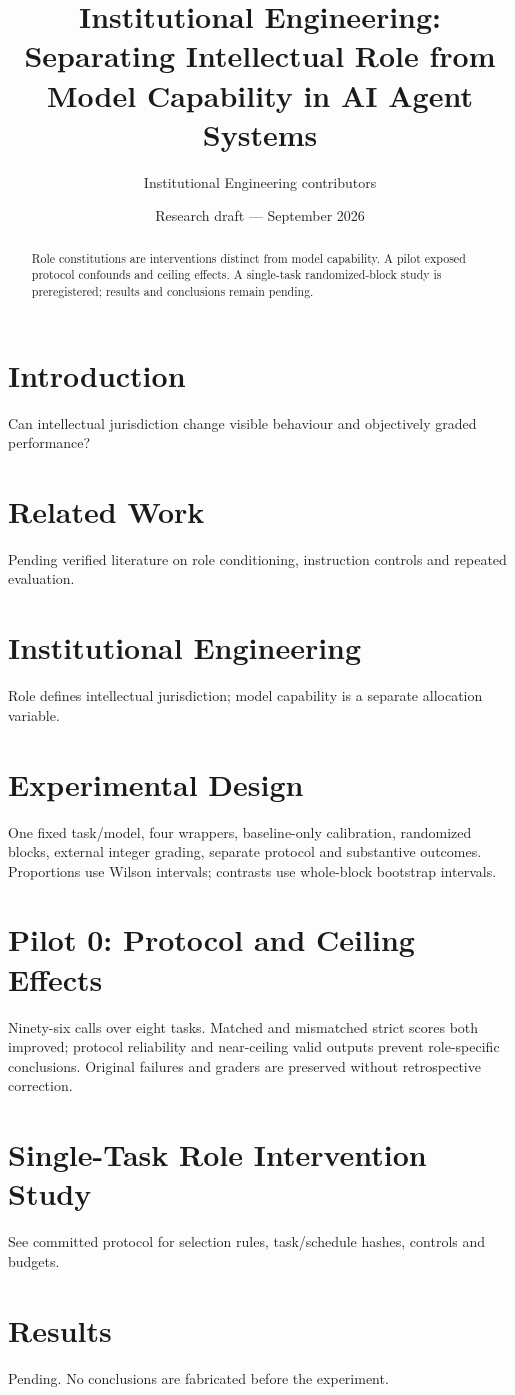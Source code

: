 \documentclass{article}
\title{Institutional Engineering: Separating Intellectual Role from Model Capability in AI Agent Systems}
\author{Institutional Engineering contributors}
\date{Research draft --- September 2026}
\begin{document}
\maketitle
\begin{abstract}
Role constitutions are interventions distinct from model capability. A pilot exposed
protocol confounds and ceiling effects. A single-task randomized-block study is
preregistered; results and conclusions remain pending.
\end{abstract}
\section{Introduction}
Can intellectual jurisdiction change visible behaviour and objectively graded performance?
\section{Related Work}
Pending verified literature on role conditioning, instruction controls and repeated evaluation.
\section{Institutional Engineering}
Role defines intellectual jurisdiction; model capability is a separate allocation variable.
\section{Experimental Design}
One fixed task/model, four wrappers, baseline-only calibration, randomized blocks,
external integer grading, separate protocol and substantive outcomes.
Proportions use Wilson intervals\cite{nistwilson}; contrasts use whole-block bootstrap intervals.
\section{Pilot 0: Protocol and Ceiling Effects}
Ninety-six calls over eight tasks. Matched and mismatched strict scores both improved;
protocol reliability and near-ceiling valid outputs prevent role-specific conclusions.
Original failures and graders are preserved without retrospective correction.
\section{Single-Task Role Intervention Study}
See committed protocol for selection rules, task/schedule hashes, controls and budgets.
\section{Results}
Pending. No conclusions are fabricated before the experiment.
\end{document}
